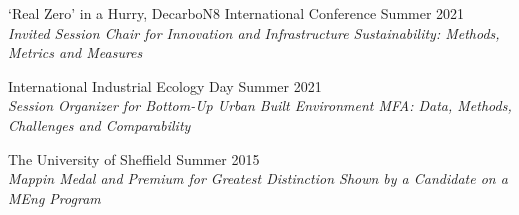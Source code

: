 \documentclass[10pt]{article}
\newcommand{\blankline}{\quad\pagebreak[3]}
\begin{document}
`Real Zero' in a Hurry, DecarboN8 International Conference \hfill {Summer 2021}\\
\emph{Invited Session Chair for Innovation and Infrastructure Sustainability: Methods, Metrics and Measures}

\blankline

International Industrial Ecology Day \hfill {Summer 2021}\\
\emph{Session Organizer for Bottom-Up Urban Built Environment MFA: Data, Methods, Challenges and Comparability}

\blankline


%
%
%
%
The University of Sheffield \hfill {Summer 2015}\\
\emph{Mappin Medal and Premium for Greatest Distinction Shown by a Candidate on a MEng Program}%
%
%
%
%
%
\blankline
%
\renewcommand{\labelenumi}{J\theenumi.} 
\end{document}
